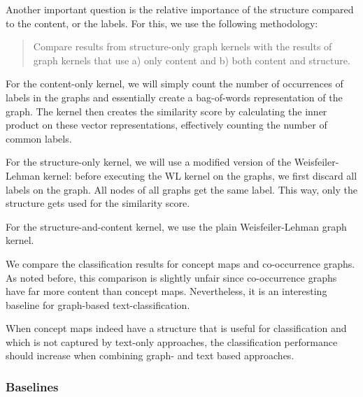 Another important question is the relative importance of the structure compared to the content, or the labels. For this, we use the following methodology:

\begin{quote}
Compare results from structure-only graph kernels with the results of graph kernels that use a) only content and b) both content and structure.
\end{quote}

For the content-only kernel, we will simply count the number of occurrences of labels in the graphs and essentially create a bag-of-words representation of the graph. The kernel then creates the similarity score by calculating the inner product on these vector representations, effectively counting the number of common labels.

For the structure-only kernel, we will use a modified version of the Weisfeiler-Lehman kernel: before executing the WL kernel on the graphs, we first discard all labels on the graph. All nodes of all graphs get the same label. This way, only the structure gets used for the similarity score.

For the structure-and-content kernel, we use the plain Weisfeiler-Lehman graph kernel.

We compare the classification results for concept maps and co-occurrence graphs. As noted before, this comparison is slightly unfair since co-occurrence graphs have far more content than concept maps.
Nevertheless, it is an interesting baseline for graph-based text-classification.


When concept maps indeed have a structure that is useful for classification and which is not captured by text-only approaches, the classification performance should increase when combining graph- and text based approaches.

\subsubsection{Baselines}
